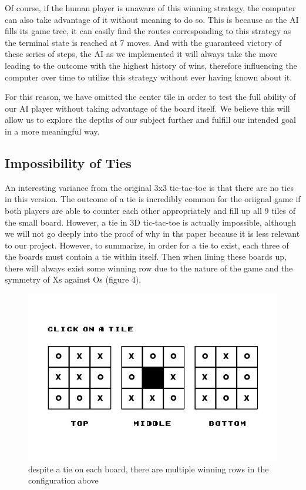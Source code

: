 \documentclass[preprint,12pt]{elsarticle}
\begin{document}
		Of course, if the human player is unaware of this winning strategy, the computer can also take advantage of it without meaning to do so. This is because as the AI fills its game tree, it can easily find the routes corresponding to this strategy as the terminal state is reached at 7 moves. And with the guaranteed victory of these series of steps, the AI as we implemented it will always take the move leading to the outcome with the highest history of wins, therefore influencing the computer over time to utilize this strategy without ever having known about it.

		For this reason, we have omitted the center tile in order to test the full ability of our AI player without taking advantage of the board itself. We believe this will allow us to explore the depths of our subject further and fulfill our intended goal in a more meaningful way.

	\subsection{Impossibility of Ties}
		An interesting variance from the original 3x3 tic-tac-toe is that there are no ties in this version. The outcome of a tie is incredibly common for the oriignal game if both players are able to counter each other appropriately and fill up all 9 tiles of the small board. However, a tie in 3D tic-tac-toe is actually impossible, although we will not go deeply into the proof of why in ths paper because it is less relevant to our project. However, to summarize, in order for a tie to exist, each three of the boards must contain a tie within itself. Then when lining these boards up, there will always exist some winning row due to the nature of the game and the symmetry of Xs against Os (figure 4).

		\begin{figure}[h]
			\centering\includegraphics[width=0.5\linewidth]{2.jpg}
			\caption{despite a tie on each board, there are multiple winning rows in the configuration above}
		\end{figure}
\end{document}
